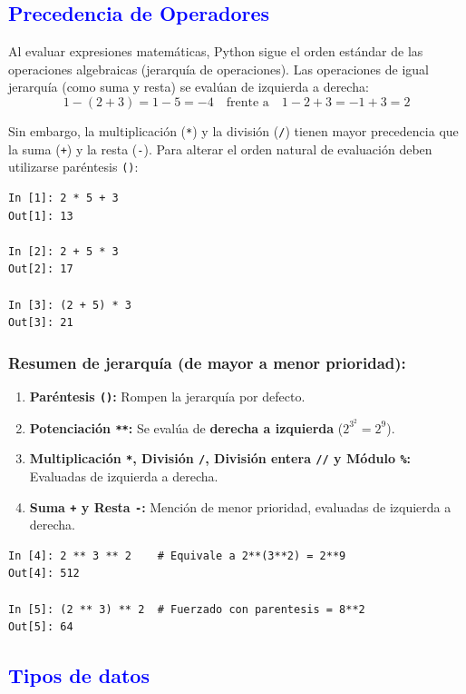 \documentclass[12pt]{article}
\begin{document}
\subsection*{\textcolor{blue}{Precedencia de Operadores}}

Al evaluar expresiones matemáticas, Python sigue el orden estándar de las operaciones 
algebraicas (jerarquía de operaciones). Las operaciones de igual jerarquía (como suma y resta) 
se evalúan de izquierda a derecha:
\[
1 - (2 + 3) = 1 - 5 = -4 \quad \text{frente a} \quad 1 - 2 + 3 = -1 + 3 = 2
\]

Sin embargo, la multiplicación (\texttt{*}) y la división (\texttt{/}) tienen mayor 
precedencia que la suma (\texttt{+}) y la resta (\texttt{-}). 
Para alterar el orden natural de evaluación deben utilizarse paréntesis \texttt{()}:

\begin{lstlisting}
In [1]: 2 * 5 + 3
Out[1]: 13

In [2]: 2 + 5 * 3
Out[2]: 17

In [3]: (2 + 5) * 3
Out[3]: 21
\end{lstlisting}

\subsubsection*{Resumen de jerarquía (de mayor a menor prioridad):}

\begin{enumerate}[leftmargin=*]
    \item \textbf{Paréntesis \texttt{()}:} Rompen la jerarquía por defecto.
    \item \textbf{Potenciación \texttt{**}:} Se evalúa de \textbf{derecha a izquierda} ($2^{3^2} = 2^9$).
    \item \textbf{Multiplicación \texttt{*}, División \texttt{/}, División entera \texttt{//} y Módulo \texttt{\%}:} Evaluadas de izquierda a derecha.
    \item \textbf{Suma \texttt{+} y Resta \texttt{-}:} Mención de menor prioridad, evaluadas de izquierda a derecha.
\end{enumerate}

\begin{lstlisting}
In [4]: 2 ** 3 ** 2    # Equivale a 2**(3**2) = 2**9
Out[4]: 512

In [5]: (2 ** 3) ** 2  # Fuerzado con parentesis = 8**2
Out[5]: 64
\end{lstlisting}

\subsection*{\textcolor{blue}{Tipos de datos}}
\end{document}
